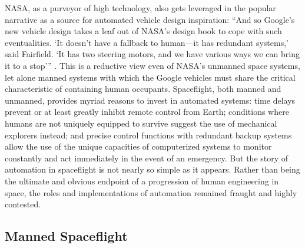 
NASA, as a purveyor of high technology, also
gets leveraged in the popular narrative as a source for
  automated vehicle design inspiration: ``And so Google's new vehicle
  design 
takes a leaf out of NASA's design book to cope with such
eventualities. `It doesn't have a fallback to human---it has redundant
systems,' said Fairfield. `It has two steering motors, and we have
various ways we can bring it to a stop''' \cite{simonite}. This is a
reductive view even of NASA's unmanned space
systems, let alone manned systems with which the Google vehicles must share
the critical characteristic of containing human occupants.
Spaceflight, both manned and unmanned, provides myriad reasons to
invest in automated systems: time delays prevent or at least greatly
inhibit remote control from Earth; conditions where humans are not
uniquely equipped to survive suggest the use of mechanical explorers
instead; and precise control functions with redundant backup systems
allow the use of the unique capacities of computerized systems to
monitor constantly and act immediately in the event of an emergency.
 But the story of automation in spaceflight is
not nearly so simple as it appears. Rather than being the ultimate and
obvious endpoint of a progression of human engineering in space, the
roles and implementations of automation remained fraught and highly
contested. 


\subsection{Manned Spaceflight}



